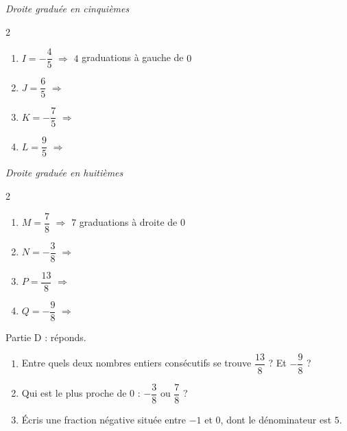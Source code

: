 \textit{Droite graduée en cinquièmes}

\begin{center}
\end{center}

\begin{multicols}{2}
\begin{enumerate}[leftmargin=*,align=parleft, label=\alph*), itemsep=9pt]
\item $I=-\dfrac{4}{5}$ \quad $\Longrightarrow$ \quad $4$ graduations à gauche de $0$
\item $J=\dfrac{6}{5}$ \quad $\Longrightarrow$
\item $K=-\dfrac{7}{5}$ \quad $\Longrightarrow$
\item $L=\dfrac{9}{5}$ \quad $\Longrightarrow$
\end{enumerate}
\end{multicols}

\bigskip
\textit{Droite graduée en huitièmes}

\begin{center}
\end{center}

\begin{multicols}{2}
\begin{enumerate}[leftmargin=*,align=parleft, label=\alph*), itemsep=9pt, start=5]
\item $M=\dfrac{7}{8}$ \quad $\Longrightarrow$ \quad $7$ graduations à droite de $0$
\item $N=-\dfrac{3}{8}$ \quad $\Longrightarrow$
\item $P=\dfrac{13}{8}$ \quad $\Longrightarrow$
\item $Q=-\dfrac{9}{8}$ \quad $\Longrightarrow$
\end{enumerate}
\end{multicols}

\medskip
\textcolor{themeColor}{Partie D} : réponds.

\begin{enumerate}[leftmargin=*,align=parleft, label=\alph*), itemsep=9pt, start=9]
\item Entre quels deux nombres entiers consécutifs se trouve $\dfrac{13}{8}$ ? Et $-\dfrac{9}{8}$ ?
\item Qui est le plus proche de $0$ : $-\dfrac{3}{8}$ ou $\dfrac{7}{8}$ ?
\item Écris une fraction négative située entre $-1$ et $0$, dont le dénominateur est $5$.
\end{enumerate}

